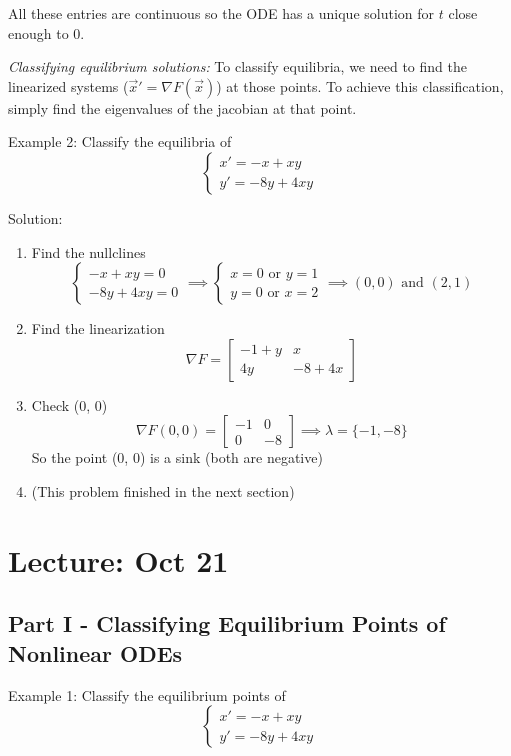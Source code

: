 \documentclass[12pt]{article}
\begin{document}
All these entries are continuous so the ODE has a unique solution for $t$ close enough to 0.

\emph{Classifying equilibrium solutions:}
To classify equilibria, we need to find the linearized systems ($\vec{x}' = \nabla F(\vec{x})$) at those points. To achieve this classification, simply find the eigenvalues of the jacobian at that point.

Example 2: Classify the equilibria of 
\[\begin{cases}
    x' = -x + xy\\
    y' = -8y + 4xy
\end{cases}\]

Solution:
\begin{enumerate}
    \item Find the nullclines 
    \[\begin{cases}
        -x + xy = 0\\
        -8y + 4xy = 0
    \end{cases} \implies \begin{cases}
        x = 0 \text{ or } y = 1\\
        y = 0 \text{ or } x = 2
    \end{cases} \implies (0, 0) \text{ and } (2, 1)\]

    \item Find the linearization
    \[\nabla F = \begin{bmatrix}
        -1 + y & x\\
        4y & -8 + 4x
    \end{bmatrix}\]

    \item Check (0, 0)
    \[\nabla F(0, 0) = \begin{bmatrix}
        -1 & 0\\
        0 & -8
    \end{bmatrix} \implies \lambda = \{-1, -8\}\] 
    So the point (0, 0) is a sink (both are negative)

    \item (This problem finished in the next section)
\end{enumerate}

\section{Lecture: Oct 21}
\subsection*{Part I - Classifying Equilibrium Points of Nonlinear ODEs}
Example 1: Classify the equilibrium points of
\[\begin{cases}
    x' = -x + xy\\
    y' = -8y + 4xy
\end{cases}\]
\end{document}
